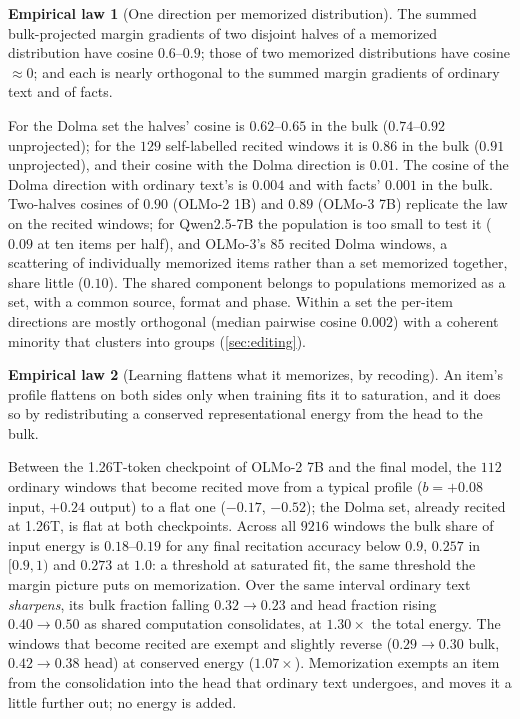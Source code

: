 \documentclass{article}
\theoremstyle{definition}\newtheorem{law}{Empirical law}
\begin{document}
\begin{law}[One direction per memorized distribution]\label{law:direction}
The summed bulk-projected margin gradients of two disjoint halves of a memorized distribution have cosine $0.6$--$0.9$; those of two memorized distributions have cosine $\approx0$; and each is nearly orthogonal to the summed margin gradients of ordinary text and of facts.
\end{law}
For the Dolma set the halves' cosine is $0.62$--$0.65$ in the bulk ($0.74$--$0.92$ unprojected); for the $129$ self-labelled recited windows it is $0.86$ in the bulk ($0.91$ unprojected), and their cosine with the Dolma direction is $0.01$. The cosine of the Dolma direction with ordinary text's is $0.004$ and with facts' $0.001$ in the bulk. Two-halves cosines of $0.90$ (OLMo-2 1B) and $0.89$ (OLMo-3 7B) replicate the law on the recited windows; for Qwen2.5-7B the population is too small to test it ($0.09$ at ten items per half), and OLMo-3's $85$ recited Dolma windows, a scattering of individually memorized items rather than a set memorized together, share little ($0.10$). The shared component belongs to populations memorized as a set, with a common source, format and phase. Within a set the per-item directions are mostly orthogonal (median pairwise cosine $0.002$) with a coherent minority that clusters into groups (\cref{sec:editing}).

\begin{law}[Learning flattens what it memorizes, by recoding]\label{law:dynamics}
An item's profile flattens on both sides only when training fits it to saturation, and it does so by redistributing a conserved representational energy from the head to the bulk.
\end{law}
Between the 1.26T-token checkpoint of OLMo-2 7B and the final model, the $112$ ordinary windows that become recited move from a typical profile ($b=+0.08$ input, $+0.24$ output) to a flat one ($-0.17$, $-0.52$); the Dolma set, already recited at 1.26T, is flat at both checkpoints. Across all $9216$ windows the bulk share of input energy is $0.18$--$0.19$ for any final recitation accuracy below $0.9$, $0.257$ in $[0.9,1)$ and $0.273$ at $1.0$: a threshold at saturated fit, the same threshold the margin picture puts on memorization. Over the same interval ordinary text \emph{sharpens}, its bulk fraction falling $0.32\to0.23$ and head fraction rising $0.40\to0.50$ as shared computation consolidates, at $1.30\times$ the total energy. The windows that become recited are exempt and slightly reverse ($0.29\to0.30$ bulk, $0.42\to0.38$ head) at conserved energy ($1.07\times$). Memorization exempts an item from the consolidation into the head that ordinary text undergoes, and moves it a little further out; no energy is added.
\end{document}
